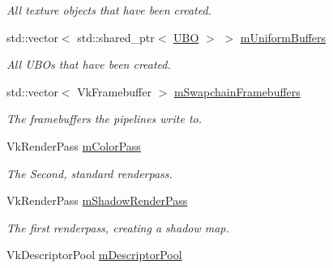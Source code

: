 \begin{DoxyCompactItemize}
\begin{DoxyCompactList}\small\item\em All texture objects that have been created. \end{DoxyCompactList}\item 
\mbox{\label{class_render_system_a245fe0a2308f6868a3c19d25a6db8646}} 
std\+::vector$<$ std\+::shared\+\_\+ptr$<$ \mbox{\hyperlink{struct_u_b_o}{U\+BO}} $>$ $>$ \mbox{\hyperlink{class_render_system_a245fe0a2308f6868a3c19d25a6db8646}{m\+Uniform\+Buffers}}
\begin{DoxyCompactList}\small\item\em All U\+B\+Os that have been created. \end{DoxyCompactList}\item 
\mbox{\label{class_render_system_a5871df67881e36f34cf8379669721c03}} 
std\+::vector$<$ Vk\+Framebuffer $>$ \mbox{\hyperlink{class_render_system_a5871df67881e36f34cf8379669721c03}{m\+Swapchain\+Framebuffers}}
\begin{DoxyCompactList}\small\item\em The framebuffers the pipelines write to. \end{DoxyCompactList}\item 
\mbox{\label{class_render_system_accda78ee2421bda18e46311aa573272d}} 
Vk\+Render\+Pass \mbox{\hyperlink{class_render_system_accda78ee2421bda18e46311aa573272d}{m\+Color\+Pass}}
\begin{DoxyCompactList}\small\item\em The Second, standard renderpass. \end{DoxyCompactList}\item 
\mbox{\label{class_render_system_ae28ff7c7d5f0f710aafdb4f718e32eb7}} 
Vk\+Render\+Pass \mbox{\hyperlink{class_render_system_ae28ff7c7d5f0f710aafdb4f718e32eb7}{m\+Shadow\+Render\+Pass}}
\begin{DoxyCompactList}\small\item\em The first renderpass, creating a shadow map. \end{DoxyCompactList}\item 
\mbox{\label{class_render_system_a5be2c2304e936d2ab7f26967aaa5ee47}} 
Vk\+Descriptor\+Pool \mbox{\hyperlink{class_render_system_a5be2c2304e936d2ab7f26967aaa5ee47}{m\+Descriptor\+Pool}}

\end{DoxyCompactItemize}
